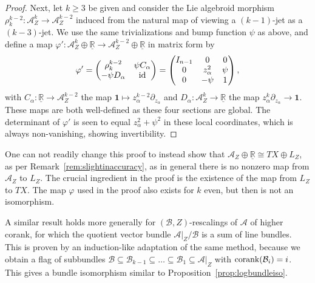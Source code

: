 \documentclass[10pt,a4paper]{amsart}
\numberwithin{equation}{section}
\begin{document}
\begin{proof}
Next, let $k \geq 3$ be given and consider the Lie algebroid morphism $\rho_k^{k-2} \colon \mathcal{A}_Z^k \to \mathcal{A}_Z^{k-2}$ induced from the natural map of viewing a $(k-1)$-jet as a $(k-3)$-jet. We use the same trivializations and bump function $\psi$ as above, and define a map $\varphi'\colon \mathcal{A}_Z^k \oplus \underline{\mathbb{R}} \to \mathcal{A}_Z^{k-2} \oplus \underline{\mathbb{R}}$ in matrix form by
\begin{displaymath}
	\varphi' = \begin{pmatrix} \rho_k^{k-2} & \psi C_\alpha \\ -\psi D_\alpha & {\rm id} \end{pmatrix} = \begin{pmatrix} I_{n-1} & 0 & 0 \\ 0 & z_\alpha^2 & \psi \\ 0 & -\psi & 1 \end{pmatrix},
\end{displaymath}
with $C_\alpha\colon \underline{\mathbb{R}} \to \mathcal{A}_Z^{k-2}$ the map $\mathbf{1} \mapsto z_\alpha^{k-2} \partial_{z_\alpha}$ and $D_\alpha\colon \mathcal{A}_Z^k \to \underline{\mathbb{R}}$ the map $z_\alpha^k \partial_{z_\alpha} \to \mathbf{1}$. These maps are both well-defined as these four sections are global. The determinant of $\varphi'$ is seen to equal $z_\alpha^2 + \psi^2$ in these local coordinates, which is always non-vanishing, showing invertibility.
\end{proof}

\begin{Remark} One can not readily change this proof to instead show that $\mathcal{A}_Z \oplus \underline{\mathbb{R}} \cong TX \oplus L_Z$, as per Remark~\ref{rem:slightinaccuracy}, as in general there is no nonzero map from $\mathcal{A}_Z$ to $L_Z$. The crucial ingredient in the proof is the existence of the map from $L_Z$ to $TX$. The map $\varphi$ used in the proof also exists for $k$ even, but then is not an isomorphism.
\end{Remark}

A similar result holds more generally for $(\mathcal{B},Z)$-rescalings of $\mathcal{A}$ of higher corank, for which the quotient vector bundle $\mathcal{A}|_Z/\mathcal{B}$ is a sum of line bundles. This is proven by an induction-like adaptation of the same method, because we obtain a flag of subbundles $\mathcal{B} \subseteq \mathcal{B}_{k-1} \subseteq \dots \subseteq \mathcal{B}_1 \subseteq \mathcal{A}|_Z$ with ${\rm corank}(\mathcal{B}_i) = i$. This gives a bundle isomorphism similar to Proposition~\ref{prop:logbundleiso}.
\end{document}
